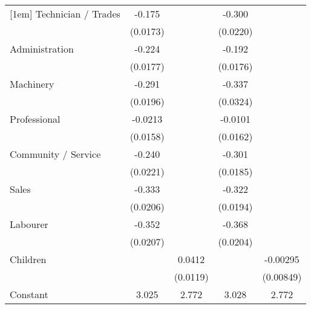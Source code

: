 {\begin{tabular}{l*{4}{c}}
[1em]
Technician / Trades &      -0.175\sym{***}&                     &      -0.300\sym{***}&                     \\
                    &    (0.0173)         &                     &    (0.0220)         &                     \\
[1em]
Administration      &      -0.224\sym{***}&                     &      -0.192\sym{***}&                     \\
                    &    (0.0177)         &                     &    (0.0176)         &                     \\
[1em]
Machinery           &      -0.291\sym{***}&                     &      -0.337\sym{***}&                     \\
                    &    (0.0196)         &                     &    (0.0324)         &                     \\
[1em]
Professional        &     -0.0213         &                     &     -0.0101         &                     \\
                    &    (0.0158)         &                     &    (0.0162)         &                     \\
[1em]
Community / Service &      -0.240\sym{***}&                     &      -0.301\sym{***}&                     \\
                    &    (0.0221)         &                     &    (0.0185)         &                     \\
[1em]
Sales               &      -0.333\sym{***}&                     &      -0.322\sym{***}&                     \\
                    &    (0.0206)         &                     &    (0.0194)         &                     \\
[1em]
Labourer            &      -0.352\sym{***}&                     &      -0.368\sym{***}&                     \\
                    &    (0.0207)         &                     &    (0.0204)         &                     \\
[1em]
Children            &                     &      0.0412\sym{***}&                     &    -0.00295         \\
                    &                     &    (0.0119)         &                     &   (0.00849)         \\
[1em]
Constant            &       3.025\sym{***}&       2.772\sym{***}&       3.028\sym{***}&       2.772\sym{***}\\

\end{tabular}}
